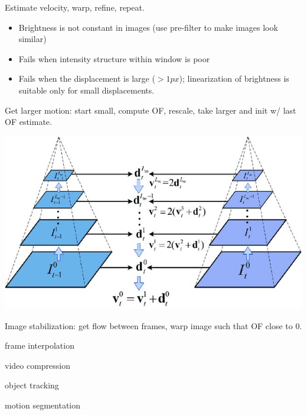 \begin{definition}
  Estimate velocity, warp, refine, repeat.
\end{definition}

\begin{definition}
  \begin{itemize}
    \item Brightness is not constant in images (use pre-filter to make images look similar)
    \item Fails when intensity structure within window is poor
    \item Fails when the displacement is large (\(> 1 px\)); linearization of brightness is suitable only for small displacements.
  \end{itemize}
\end{definition}

\begin{algorithm}
  Get larger motion: start small, compute OF, rescale, take larger and init w/ last OF estimate.
\end{algorithm}
\begin{center}
  \includegraphics*[width=.7\linewidth]{assets/coarse-to-fine.jpg}
\end{center}

\begin{definition}[Applications]
  \begin{itemize*}
    \item Image stabilization: get flow between frames, warp image such that OF close to 0.
    \item frame interpolation
    \item video compression
    \item object tracking
    \item motion segmentation
  \end{itemize*}
\end{definition}

